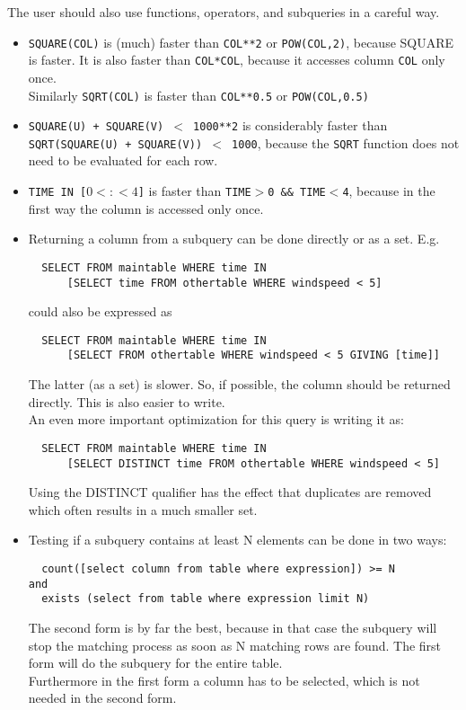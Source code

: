 The user should also use functions, operators, and subqueries in a careful way.
\begin{itemize}

\item
\texttt{SQUARE(COL)} is (much) faster than \texttt{COL}\verb+**+\texttt{2}
or \texttt{POW(COL,2)}, because SQUARE is faster.
It is also faster than \texttt{COL*COL}, because it accesses column
\texttt{COL} only once.
\\Similarly \texttt{SQRT(COL)} is faster than \texttt{COL}\verb+**+\texttt{0.5}
or \texttt{POW(COL,0.5)}

\item
\texttt{SQUARE(U) + SQUARE(V) $<$ 1000}\verb+**+\texttt{2} is considerably faster
than
\\\texttt{SQRT(SQUARE(U) + SQUARE(V)) $<$ 1000}, because the
\texttt{SQRT} function does not need to be evaluated for each row.

\item
\texttt{TIME IN [$0<:<4$]} is faster than
\texttt{TIME$>$0 \&\& TIME$<$4}, because in the first way the column is
accessed only once.

\item
Returning a column from a subquery can be done directly or as a
set. E.g.
\begin{verbatim}
  SELECT FROM maintable WHERE time IN
      [SELECT time FROM othertable WHERE windspeed < 5]
\end{verbatim}
could also be expressed as
\begin{verbatim}
  SELECT FROM maintable WHERE time IN
      [SELECT FROM othertable WHERE windspeed < 5 GIVING [time]]
\end{verbatim}
The latter (as a set) is slower. So, if possible, the column should
be returned directly. This is also easier to write.
\\An even more important optimization for this query is writing it as:
\begin{verbatim}
  SELECT FROM maintable WHERE time IN
      [SELECT DISTINCT time FROM othertable WHERE windspeed < 5]
\end{verbatim}
Using the DISTINCT qualifier has the effect that duplicates are
removed which often results in a much smaller set.

\item
Testing if a subquery contains at least N elements can be done in two
ways:
\begin{verbatim}
  count([select column from table where expression]) >= N
and
  exists (select from table where expression limit N)
\end{verbatim}
The second form is by far the best, because in that case the subquery
will stop the matching process as soon as N matching rows are found.
The first form will do the subquery for the entire table.
\\Furthermore in the first form a column has to be selected, which is
not needed in the second form.


\end{itemize}
